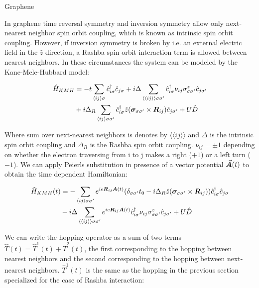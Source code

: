 \begin{section}{Graphene}

In graphene time reversal symmetry and inversion symmetry allow only next-nearest neighbor spin orbit coupling, which is known as intrinsic spin orbit coupling. However, if inversion symmetry is broken by i.e. an external electric field in the $\hat{z}$ direction, a Rashba spin orbit interaction term is allowed between nearest neighbors. In these circumstances the system can be modeled by the Kane-Mele-Hubbard model:

\begin{align}
\hat{H}_{KMH} &= -t\sum_{\langle i j \rangle \sigma} \hat{c}^{\dagger}_{i\sigma}\hat{c}_{j\sigma} + i\Delta \sum_{\langle \langle i j \rangle \rangle \sigma \sigma'} \hat{c}^{\dagger}_{i\sigma} \nu_{ij} \sigma^z_{\sigma \sigma'} \hat{c}_{j\sigma'} \nonumber \\
&+ i\Delta_R \sum_{\langle i j \rangle \sigma \sigma'} \hat{c}^{\dagger}_{i\sigma} \hat{z}(\boldsymbol{\sigma}_{\sigma \sigma'} \times \boldsymbol{R}_{ij}) \hat{c}_{j\sigma'} + U\hat{D}
\end{align}

Where sum over next-nearest neighbors is denotes by $\langle \langle i j \rangle \rangle$ and $\Delta$ is the intrinsic spin orbit coupling and $\Delta_R$ is the Rashba spin orbit coupling. $\nu_{ij}=\pm 1$ depending on whether the electron traversing from i to j makes a right ($+1$) or a left turn ($-1$).
We can apply Peierls substitution in presence of a vector potential $\vec{\boldsymbol{A}}(t)$ to obtain the time dependent Hamiltonian:

\begin{align}
\hat{H}_{KMH}(t) &= -\sum_{\langle i j \rangle \sigma \sigma'} e^{ie\boldsymbol{R}_{ij}\boldsymbol{A}(t)} (\delta_{\sigma \sigma'}t_0 - i\Delta_R \hat{z}(\boldsymbol{\sigma}_{\sigma \sigma'} \times \boldsymbol{R}_{ij})) \hat{c}^{\dagger}_{i\sigma}\hat{c}_{j\sigma} \nonumber \\
&+ i\Delta \sum_{\langle \langle i j \rangle \rangle \sigma \sigma'}  e^{ie\boldsymbol{R}_{ij}\boldsymbol{A}(t)} \hat{c}^{\dagger}_{i\sigma} \nu_{ij} \sigma^z_{\sigma \sigma'} \hat{c}_{j\sigma'} + U\hat{D}
\end{align}

We can write the hopping operator as a sum of two terms $\hat{T}(t) = \hat{T}^1(t) + \hat{T}^2(t)$, the first corresponding to the hopping between nearest neighbors and the second corresponding to the hopping between next-nearest neighbors. $\hat{T}^1(t)$ is the same as the hopping in the previous section specialized for the case of Rashba interaction:


\end{section}
